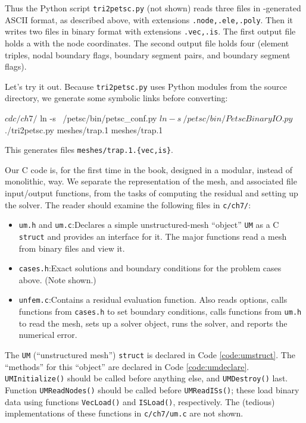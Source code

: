 Thus the Python script \texttt{tri2petsc.py} (not shown) reads three files in \Triangle-generated ASCII format, as described above, with extensions \texttt{.node,.ele,.poly}.  Then it writes two files in \PETSc binary format with extensions \texttt{.vec,.is}.  The first output file holds a \pVec with the node coordinates.  The second output file holds four \pISs (element triples, nodal boundary flags, boundary segment pairs, and boundary segment flags).

Let's try it out.  Because \texttt{tri2petsc.py} uses Python modules from the \PETSc source directory, we generate some symbolic links before converting:
\begin{cline}
$ cd c/ch7/
$ ln -s ~/petsc/bin/petsc_conf.py
$ ln -s ~/petsc/bin/PetscBinaryIO.py
$ ./tri2petsc.py meshes/trap.1 meshes/trap.1
\end{cline}
This generates files \texttt{meshes/trap.1.\{vec,is\}}.


Our C code is, for the first time in the book, designed in a modular, instead of monolithic, way.  We separate the representation of the mesh, and associated file input/output functions, from the tasks of computing the residual and setting up the \PETSc solver.  The reader should examine the following files in \texttt{c/ch7/}:
\begin{itemize}
\item \texttt{um.h} and \texttt{um.c}:\quad  Declares a simple unstructured-mesh ``object'' \texttt{UM} as a C \texttt{struct} and provides an interface for it.  The major functions read a mesh from binary files and view it.
\item \texttt{cases.h}:\quad  Exact solutions and boundary conditions for the problem cases above.  (Note shown.)
\item \texttt{unfem.c}:\quad  Contains a residual evaluation function.  Also reads options, calls functions from \texttt{cases.h} to set boundary conditions, calls functions from \texttt{um.h} to read the mesh, sets up a \pSNES solver object, runs the solver, and reports the numerical error.
\end{itemize}

The \texttt{UM} (``unstructured mesh'') \texttt{struct} is declared in Code \ref{code:umstruct}.  The ``methods'' for this ``object'' are declared in Code \ref{code:umdeclare}.  \texttt{UMInitialize()} should be called before anything else, and \texttt{UMDestroy()} last.  Function \texttt{UMReadNodes()} should be called before \texttt{UMReadISs()}; these load binary data using \PETSc functions  \texttt{VecLoad()} and \texttt{ISLoad()}, respectively.  The (tedious) implementations of these functions in \texttt{c/ch7/um.c} are not shown.

